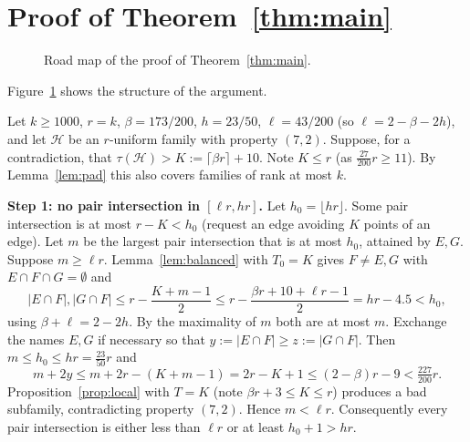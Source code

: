 \documentclass[11pt]{amsart}
\theoremstyle{definition}
\theoremstyle{remark}
\newcommand{\cH}{\mathcal H}
\newcommand{\ceil}[1]{\lceil #1\rceil}
\newcommand{\floor}[1]{\lfloor #1\rfloor}
\begin{document}
\section{Proof of Theorem~\ref{thm:main}}\label{sec:main}

\begin{figure}[t]
\centering
{}
\caption{Road map of the proof of Theorem~\ref{thm:main}.}\label{fig:roadmap}
\end{figure}

Figure~\ref{fig:roadmap} shows the structure of the argument.


Let $k\ge1000$, $r=k$, $\beta=173/200$, $h=23/50$, $\ell=43/200$ (so $\ell=2-\beta-2h$), and let $\cH$ be an $r$-uniform family with property $(7,2)$. Suppose, for a contradiction, that $\tau(\cH)>K:=\ceil{\beta r}+10$. Note $K\le r$ (as $\tfrac{27}{200}r\ge11$). By Lemma~\ref{lem:pad} this also covers families of rank at most $k$.

\medskip\noindent\textbf{Step 1: no pair intersection in $[\ell r,hr]$.} Let $h_0=\floor{hr}$. Some pair intersection is at most $r-K<h_0$ (request an edge avoiding $K$ points of an edge). Let $m$ be the largest pair intersection that is at most $h_0$, attained by $E,G$. Suppose $m\ge\ell r$. Lemma~\ref{lem:balanced} with $T_0=K$ gives $F\ne E,G$ with $E\cap F\cap G=\emptyset$ and
\[
|E\cap F|,|G\cap F|\le r-\frac{K+m-1}{2}\le r-\frac{\beta r+10+\ell r-1}{2}=hr-4.5<h_0,
\]
using $\beta+\ell=2-2h$. By the maximality of $m$ both are at most $m$. Exchange the names $E,G$ if necessary so that $y:=|E\cap F|\ge z:=|G\cap F|$. Then $m\le h_0\le hr=\tfrac{23}{50}r$ and
\[
m+2y\le m+2r-(K+m-1)=2r-K+1\le(2-\beta)r-9<\tfrac{227}{200}r .
\]
Proposition~\ref{prop:local} with $T=K$ (note $\beta r+3\le K\le r$) produces a bad subfamily, contradicting property $(7,2)$. Hence $m<\ell r$. Consequently every pair intersection is either less than $\ell r$ or at least $h_0+1>hr$.
\end{document}
